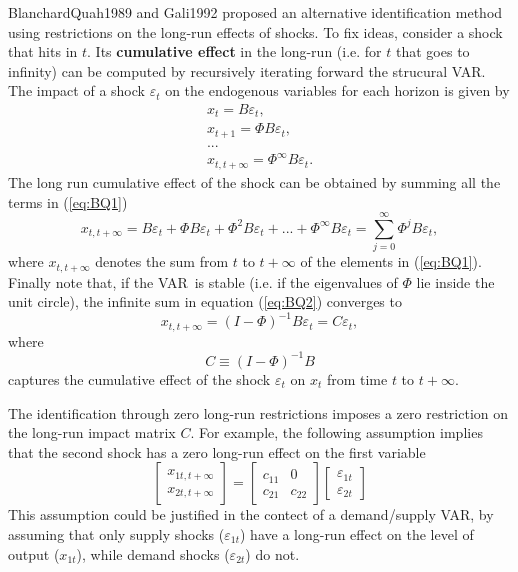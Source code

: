 \documentclass[10pt]{article}
\begin{document}
BlanchardQuah1989 and Gali1992 proposed an alternative identification method
using restrictions on the long-run effects of shocks. To fix ideas, consider
a shock that hits in $t$. Its \textbf{cumulative effect} in the long-run
(i.e. for $t$ that goes to infinity) can be computed by recursively
iterating forward the strucural VAR. The impact of a shock $\varepsilon _{t}$
on the endogenous variables for each horizon is given by%
\begin{equation}
\begin{array}{l}
x_{t}=B\varepsilon _{t}, \\ 
x_{t+1}=\Phi B\varepsilon _{t}, \\ 
... \\ 
x_{t,t+\infty }=\Phi ^{\infty }B\varepsilon _{t}.%
\end{array}
\label{eq:BQ1}
\end{equation}%
The long run cumulative effect of the shock can be obtained by summing all
the terms in (\ref{eq:BQ1})%
\begin{equation}
x_{t,t+\infty }=B\varepsilon _{t}+\Phi B\varepsilon _{t}+\Phi
^{2}B\varepsilon _{t}+...+\Phi ^{\infty }B\varepsilon
_{t}=\sum\limits_{j=0}^{\infty }\Phi ^{j}B\varepsilon _{t},  \label{eq:BQ2}
\end{equation}%
where $x_{t,t+\infty }$ denotes the sum from $t$ to $t+\infty $ of the
elements in (\ref{eq:BQ1}). Finally note that, if the VAR\ is stable (i.e.
if the eigenvalues of $\Phi $ lie inside the unit circle), the infinite sum
in equation (\ref{eq:BQ2}) converges to%
\begin{equation}
x_{t,t+\infty }=\left( I-\Phi \right) ^{-1}B\varepsilon _{t}=C\varepsilon
_{t},  \label{eq:BQ3}
\end{equation}%
where 
\begin{equation}
C\equiv \left( I-\Phi \right) ^{-1}B  \label{eq:BQ4}
\end{equation}%
captures the cumulative effect of the shock $\varepsilon _{t}$ on $x_{t}$
from time $t$ to $t+\infty $.

The identification through zero long-run restrictions imposes a zero
restriction on the long-run impact matrix $C$. For example, the following
assumption implies that the second shock has a zero long-run effect on the
first variable%
\begin{equation}
\left[ 
\begin{array}{c}
x_{1t,t+\infty } \\ 
x_{2t,t+\infty }%
\end{array}%
\right] =\left[ 
\begin{array}{cc}
c_{11} & 0 \\ 
c_{21} & c_{22}%
\end{array}%
\right] 
\begin{bmatrix}
\varepsilon _{1t} \\ 
\varepsilon _{2t}%
\end{bmatrix}
\label{eq:BQ5}
\end{equation}%
This assumption could be justified in the contect of a demand/supply VAR, by
assuming that only supply shocks ($\varepsilon _{1t}$) have a long-run
effect on the level of output ($x_{1t}$), while demand shocks ($\varepsilon
_{2t}$) do not.
\end{document}
